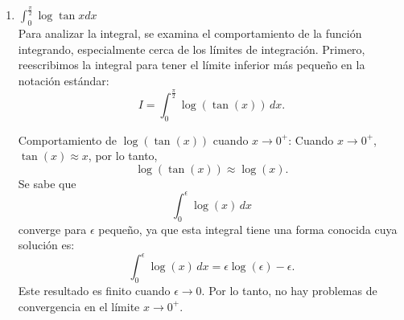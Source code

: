 \documentclass{article}
\begin{document}
\begin{enumerate}
\begin{enumerate}
\[
\frac{x}{1 - e^x} \approx \frac{x}{-e^x} = -\frac{x}{e^x}.
\]

Ahora, la integral de \(\frac{x}{e^x}\) para \(x\) grande. Como \(e^x\) crece mucho más rápido que \(x\), se puede utilizar el criterio de comparación con la función \(\frac{1}{e^x}\), que se sabe que converge. Específicamente,

\[
\int_A^\infty \frac{x}{e^x} \, dx
\]

es convergente debido a que \(e^x\) crece exponencialmente, lo que hace que el factor \(\frac{x}{e^x}\) decaiga rápidamente. Por lo tanto, el término \(\frac{x}{1 - e^x}\) es comparable a \(\frac{x}{e^x}\) y la integral es convergente en el intervalo \([A, \infty)\).

Comportamiento cuando \(x \to 1^+\):

Cuando \(x \to 1^+\), \(e^x\) se aproxima a \(e\), por lo que

\[
1 - e^x \to 1 - e.
\]

Esto implica que la función integrando se comporta de manera aproximada como

\[
\frac{x}{1 - e^x} \approx \frac{x}{1 - e},
\]

que es una función finita y constante. Por lo tanto, la integral en el intervalo \([1, 2]\) no presenta problemas de convergencia y es perfectamente integrable.
Como la integral en el intervalo \([1, \infty)\) tiene un comportamiento similar a la integral de \(\frac{x}{e^x}\), que es convergente, y en el intervalo \([1, 2]\) no presenta singularidades, se puede concluir que la integral es convergente.        
		\item $ \int_{0}^{\frac{\pi}{2}} \log \tan x dx  $
        \[\]
Para analizar la integral, se examina el comportamiento de la función integrando, especialmente cerca de los límites de integración. Primero, reescribimos la integral para tener el límite inferior más pequeño en la notación estándar:
\[
I = \int_0^{\frac{\pi}{2}} \log(\tan(x)) \, dx.
\]

Comportamiento de \( \log(\tan(x)) \) cuando \( x \to 0^+ \):
Cuando \( x \to 0^+ \), \( \tan(x) \approx x \), por lo tanto,
\[
\log(\tan(x)) \approx \log(x).
\]
Se sabe que
\[
\int_0^\epsilon \log(x) \, dx
\]
converge para \( \epsilon \) pequeño, ya que esta integral tiene una forma conocida cuya solución es:
\[
\int_0^\epsilon \log(x) \, dx = \epsilon \log(\epsilon) - \epsilon.
\]
Este resultado es finito cuando \( \epsilon \to 0 \). Por lo tanto, no hay problemas de convergencia en el límite \( x \to 0^+ \).


\end{enumerate}
\end{enumerate}
\end{document}
